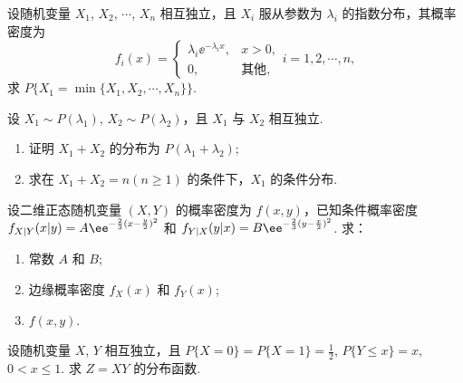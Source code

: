 	\begin{titwo}
		设随机变量 $X_{1}$, $X_{2}$, $\cdots$, $X_{n}$ 相互独立，且 $X_{i}$ 服从参数为 $\lambda_{i}$ 的指数分布，其概率密度为
		\[
			f_{i}(x) = \begin{cases}
				\lambda_{i} \ee^{- \lambda_{i} x}, & x > 0, \\
				0, & \text{其他},
			\end{cases} i = 1,2,\cdots,n,
		\]
		求 $P\{ X_{1} = \min\{ X_{1},X_{2},\cdots,X_{n} \} \}$.
	\end{titwo}

	\begin{titwo}
		设 $X_{1} \sim P(\lambda_{1})$, $X_{2} \sim P(\lambda_{2})$，且 $X_{1}$ 与 $X_{2}$ 相互独立.
		\begin{enumerate}
			\item 证明 $X_{1} + X_{2}$ 的分布为 $P(\lambda_{1} + \lambda_{2})$;
			\item 求在 $X_{1} + X_{2} = n (n \geq 1)$ 的条件下，$X_{1}$ 的条件分布.
		\end{enumerate}
	\end{titwo}

	\begin{titwo}
		设二维正态随机变量 $(X,Y)$ 的概率密度为 $f(x,y)$，已知条件概率密度 $f_{X|Y}(x|y) = A \* \ee^{ - \frac{2}{3} (x - \frac{y}{2})^{2} }$ 和 $f_{Y|X}(y|x) = B \* \ee^{-\frac{2}{3} (y - \frac{x}{2})^{2} }$. 求：
		\begin{enumerate}
			\item 常数 $A$ 和 $B$;
			\item 边缘概率密度 $f_{X}(x)$ 和 $f_{Y}(x)$;
			\item $f(x,y)$.
		\end{enumerate}
	\end{titwo}

	\begin{titwo}
		设随机变量 $X$, $Y$ 相互独立，且 $P\{ X = 0 \} = P\{ X = 1 \} = \frac{1}{2}$, $P\{ Y \leq x \} = x$, $0 < x \leq 1$. 求 $Z = XY$ 的分布函数.
	\end{titwo}